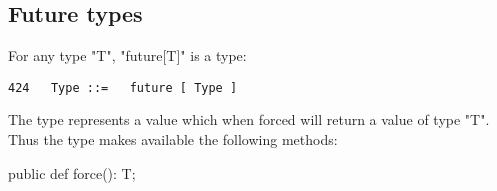 \subsection{Future types}

For any type \xcd"T", \xcd"future[T]" is a type:
\begin{verbatim}
424   Type ::=   future [ Type ] 
\end{verbatim}
The type  represents a value which when forced will return a value of type
\xcd"T". Thus the type makes available the following methods:

\begin{xten}
  public def force(): T;
\end{xten}


